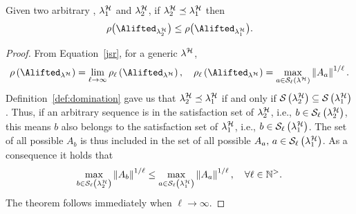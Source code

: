 \begin{theorem}%
    \label{th:rho_dominance_general}%
    Given two arbitrary \ewhc{}, $\lambda_1^{\mathcal{H}}$ and $\lambda_2^{\mathcal{H}}$, if $\lambda_2^{\mathcal{H}} \preceq \lambda_1^{\mathcal{H}}$ then
    \begin{equation*}
        \rho\bigl(\Alifted_{\lambda_2^\strat}\bigr) \leq \rho\bigl(\Alifted_{\lambda_1^\strat}\bigr).
    \end{equation*}

    \begin{proof}
        From Equation~\eqref{jsr}, for a generic \ewhc{} $\lambda^{\mathcal{H}}$,
        \begin{equation*}
            \rho\left(\Alifted_{\lambda^\strat}\right) = \lim_{\ell\rightarrow \infty}\rho_\ell\left(\Alifted_{\lambda^\strat}\right), \quad \rho_\ell\left(\Alifted_{\lambda^\strat}\right) = \max_{a \in \sset{\ell}{\lambda^\strat}}\norm{A_{a}}^{1/\ell}.
        \end{equation*}
        Definition~\ref{def:domination} gave us that $\lambda^{\mathcal{H}}_2 \preceq \lambda^{\mathcal{H}}_1$ if and only if $\mathcal{S}_{}\left( \lambda^{\mathcal{H}}_2 \right) \subseteq \mathcal{S}_{}\left( \lambda^{\mathcal{H}}_1 \right)$.
        Thus, if an arbitrary sequence is in the satisfaction set of $\lambda^{\mathcal{H}}_2$, i.e., $b \in \mathcal{S}_{\ell}\left(  \lambda^{\mathcal{H}}_2  \right)$, this means $b$ also belongs to the satisfaction set of $\lambda^{\mathcal{H}}_1$, i.e., $b \in \mathcal{S}_{\ell}\left(  \lambda^{\mathcal{H}}_1  \right)$.
        The set of all possible $A_{b}$ is thus included in the set of all possible $A_{a},\, a \in \mathcal{S}_{\ell}\left(  \lambda^{\mathcal{H}}_1  \right)$.
        As a consequence it holds that
        \begin{equation*}
            \max_{b \in \mathcal{S}_{\ell}\left( \lambda^{\mathcal{H}}_2 \right)}\left\lVert A_{b}\right\rVert^{1/\ell} \leq
            \max_{a \in \mathcal{S}_{\ell}\left( \lambda^{\mathcal{H}}_1 \right)}\left\lVert A_{a}\right\rVert^{1/\ell}, \quad
            \forall \ell\in\mathbb{N}^{>}.
        \end{equation*}
        The theorem follows immediately when $\ell\rightarrow \infty$.
    \end{proof}
\end{theorem}

